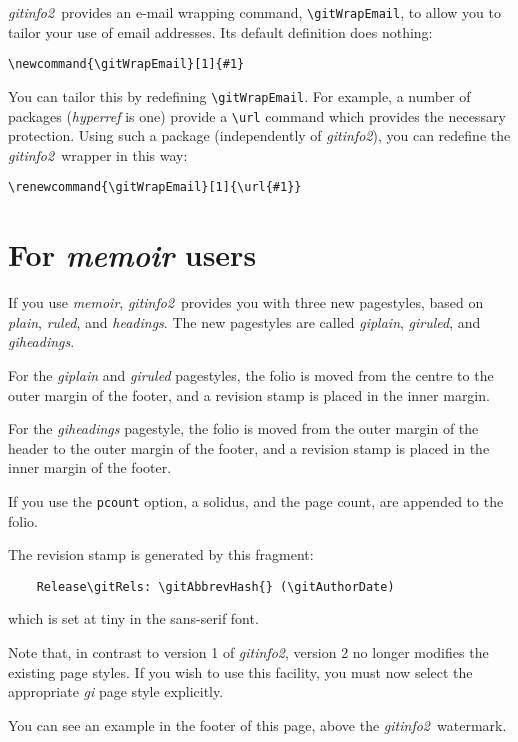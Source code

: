 \documentclass[a4paper,12pt,twoside,openany]{memoir}
\newcommand{\sfit}[1]{\textit{#1}}
\newcommand{\tpname}{\sfit{gitinfo2}}
\begin{document}
\tpname\ provides an e-mail wrapping command,
\verb!\gitWrapEmail!, to allow you to tailor your use
of email addresses. Its default definition does nothing:
\begin{verbatim}
\newcommand{\gitWrapEmail}[1]{#1}
\end{verbatim}
You can tailor this by redefining \verb!\gitWrapEmail!.
For example, a number of packages
(\sfit{hyperref} is one) provide a \verb!\url! command
which provides the necessary protection.
Using such a package (independently of \tpname),
you can redefine the \tpname\ wrapper in this way:
\begin{verbatim}
\renewcommand{\gitWrapEmail}[1]{\url{#1}}
\end{verbatim}

\section{For \sfit{memoir} users}
\label{sect:memuser}
If you use \sfit{memoir}, \tpname\ provides you with
three new pagestyles, based on
\sfit{plain}, \sfit{ruled}, and \sfit{headings}.
The new pagestyles are called
\sfit{giplain}, \sfit{giruled}, and \sfit{giheadings}.

For the \sfit{giplain} and \sfit{giruled} pagestyles,
the folio is moved from the centre to the outer margin of the footer,
and a revision stamp is placed in the inner margin.

For the \sfit{giheadings} pagestyle,
the folio is moved from the outer margin of the header
to the outer margin of the footer,
and a revision stamp is placed in the inner margin of the footer.

If you use the \texttt{pcount} option, a solidus, and the page count,
are appended to the folio.

The revision stamp is generated by this fragment:

\begin{verbatim}
    Release\gitRels: \gitAbbrevHash{} (\gitAuthorDate)
\end{verbatim}
\noindent
which is set at tiny in the sans-serif font.

Note that, in contrast to version 1 of \tpname,
version 2 no longer modifies the existing page styles.
If you wish to use this facility,
you must now select
the appropriate \sfit{gi\textellipsis} page style
explicitly.

You can see an example in the footer of this page,
above the \tpname\ watermark.
\end{document}
